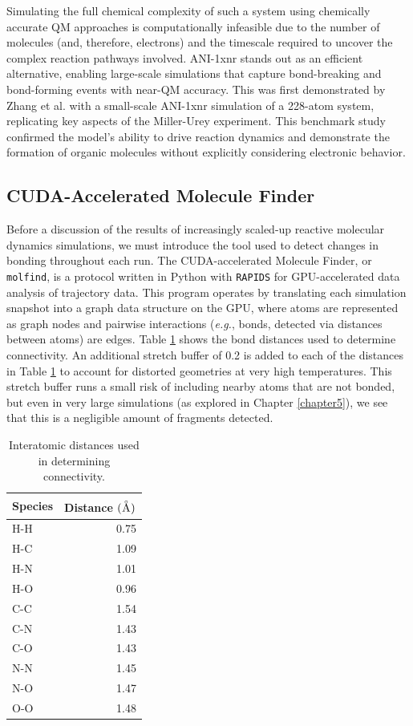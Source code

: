 Simulating the full chemical complexity of such a system using chemically accurate QM approaches is computationally infeasible due to the number of molecules (and, therefore, electrons) and the timescale required to uncover the complex reaction pathways involved.
ANI-1xnr stands out as an efficient alternative, enabling large-scale simulations that capture bond-breaking and bond-forming events with near-QM accuracy. 
This was first demonstrated by Zhang et al. \cite{ani-1xnr} with a small-scale ANI-1xnr simulation of a 228-atom system, replicating key aspects of the Miller-Urey experiment. 
This benchmark study confirmed the model’s ability to drive reaction dynamics and demonstrate the formation of organic molecules without explicitly considering electronic behavior.


\subsection{CUDA-Accelerated Molecule Finder}
\label{subsec:molfind}

Before a discussion of the results of increasingly scaled-up reactive molecular dynamics simulations, we must introduce the tool used to detect changes in bonding throughout each run.
The CUDA-accelerated Molecule Finder, or \verb|molfind|, is a protocol written in Python with \verb|RAPIDS| \cite{rapids} for GPU-accelerated data analysis of trajectory data.
This program operates by translating each simulation snapshot into a graph data structure on the GPU, where atoms are represented as graph nodes and pairwise interactions (\textit{e.g.}, bonds, detected via distances between atoms) are edges. 
Table \ref{tbl:bond_distances} shows the bond distances used to determine connectivity.
An additional stretch buffer of 0.2 \angstrom is added to each of the distances in Table \ref{tbl:bond_distances} to account for distorted geometries at very high temperatures.
This stretch buffer runs a small risk of including nearby atoms that are not bonded, but even in very large simulations (as explored in Chapter \ref{chapter5}), we see that this is a negligible amount of fragments detected.

\begin{table}[h!]
\centering
\caption[Interatomic distances used in determining connectivity]{Interatomic distances used in determining connectivity.
}\label{tbl:bond_distances}
\begin{tabularx}{0.265\textwidth}{l r}  
\toprule
Species & Distance $(\angstrom)$ \\
\midrule
H-H & 0.75 \\
H-C & 1.09 \\
H-N & 1.01 \\
H-O & 0.96 \\
C-C & 1.54 \\
C-N & 1.43 \\
C-O & 1.43 \\
N-N & 1.45 \\
N-O & 1.47 \\
O-O & 1.48 \\
\bottomrule
\end{tabularx}
\end{table}

